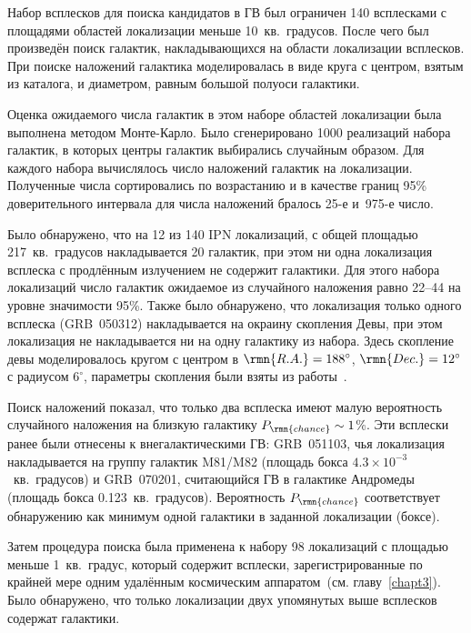 Набор всплесков для поиска кандидатов в ГВ был ограничен 140 всплесками с 
площадями областей локализации меньше 10~кв.~градусов. После чего был произведён 
поиск галактик, накладывающихся на области локализации всплесков. При поиске наложений 
галактика моделировалась в виде круга с центром, взятым из каталога, и диаметром, 
равным большой полуоси галактики. 

Оценка ожидаемого числа галактик в этом наборе областей локализации была выполнена 
методом Монте-Карло. Было сгенерировано 1000 реализаций набора галактик, в которых 
центры галактик выбирались случайным образом. Для каждого набора вычислялось число 
наложений галактик на локализации. Полученные числа сортировались по возрастанию 
и в качестве границ 95\% доверительного интервала для числа наложений 
бралось 25-е и~975-е число.

Было обнаружено, что на 12 из 140 IPN локализаций, с общей площадью 217~кв.~градусов 
накладывается 20 галактик, при этом ни одна локализация всплеска с продлённым 
излучением не содержит галактики. Для этого набора локализаций число галактик 
ожидаемое из случайного наложения равно 22--44 на уровне значимости 95\%. 
Также было обнаружено, что локализация только одного всплеска (GRB~050312) 
накладывается на окраину скопления Девы, при этом локализация не накладывается 
ни на одну галактику из набора. Здесь скопление девы моделировалось кругом с центром в 
$\rmn{R.A.}=188^\circ$, $\rmn{Dec.}=12^\circ$ с радиусом $6^\circ$, 
параметры скопления были взяты из работы~\citep{Binggeli1987}.

Поиск наложений показал, что только два всплеска имеют малую вероятность случайного 
наложения на близкую галактику $P_{\rmn{chance}} \sim 1$\%. Эти всплески ранее были 
отнесены к внегалактическими ГВ: GRB~051103, чья локализация накладывается на группу галактик M81/M82 
(площадь бокса $4.3\times10^{-3}$~кв.~градусов) и GRB~070201, считающийся ГВ в галактике 
Андромеды (площадь бокса 0.123~кв.~градусов). Вероятность $P_{\rmn{chance}}$ 
соответствует обнаружению как минимум одной галактики в заданной локализации (боксе).

Затем процедура поиска была применена к набору 98 локализаций с площадью меньше 
1~кв.~градус, который содержит всплески, зарегистрированные по крайней мере одним 
удалённым космическим аппаратом~(см. главу~\ref{chapt3}). Было обнаружено, 
что только локализации двух упомянутых выше всплесков содержат галактики.


